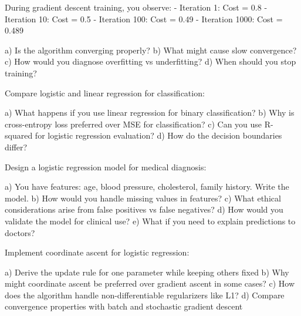 \documentclass{article}
\newcounter{exercise}
\begin{document}
\begin{tcolorbox}[colback=gray!5!white,colframe=gray!75!black,title=Problem \stepcounter{exercise}: Convergence Analysis]

During gradient descent training, you observe:
- Iteration 1: Cost = 0.8
- Iteration 10: Cost = 0.5  
- Iteration 100: Cost = 0.49
- Iteration 1000: Cost = 0.489

a) Is the algorithm converging properly?
b) What might cause slow convergence?
c) How would you diagnose overfitting vs underfitting?
d) When should you stop training?
\end{tcolorbox}

\begin{tcolorbox}[colback=gray!5!white,colframe=gray!75!black,title=Problem \stepcounter{exercise}: Comparison with Linear Regression]

Compare logistic and linear regression for classification:

a) What happens if you use linear regression for binary classification?
b) Why is cross-entropy loss preferred over MSE for classification?
c) Can you use R-squared for logistic regression evaluation?
d) How do the decision boundaries differ?
\end{tcolorbox}

\begin{tcolorbox}[colback=gray!5!white,colframe=gray!75!black,title=Problem \stepcounter{exercise}: Real-world Application]

Design a logistic regression model for medical diagnosis:

a) You have features: age, blood pressure, cholesterol, family history. Write the model.
b) How would you handle missing values in features?
c) What ethical considerations arise from false positives vs false negatives?
d) How would you validate the model for clinical use?
e) What if you need to explain predictions to doctors?
\end{tcolorbox}

\begin{tcolorbox}[colback=gray!5!white,colframe=gray!75!black,title=Problem \stepcounter{exercise}: Advanced Challenge]

Implement coordinate ascent for logistic regression:

a) Derive the update rule for one parameter while keeping others fixed
b) Why might coordinate ascent be preferred over gradient ascent in some cases?
c) How does the algorithm handle non-differentiable regularizers like L1?
d) Compare convergence properties with batch and stochastic gradient descent
\end{tcolorbox}
\end{document}
